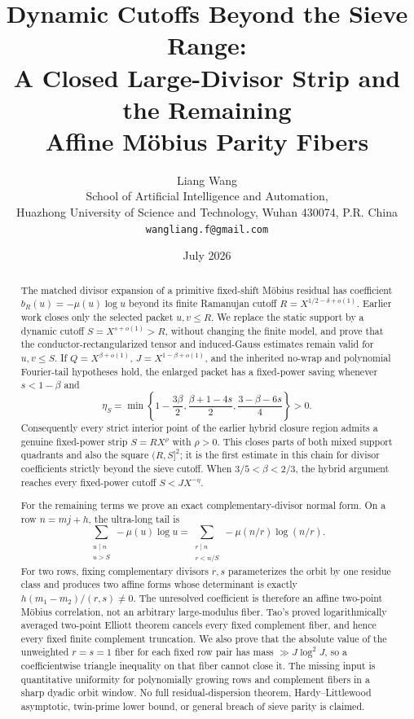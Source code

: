 \documentclass[11pt]{article}
\title{\textbf{Dynamic Cutoffs Beyond the Sieve Range:}\\
\textbf{A Closed Large-Divisor Strip and the Remaining}\\
\textbf{Affine M\"obius Parity Fibers}}
\author{Liang Wang\\
\small School of Artificial Intelligence and Automation,\\[-0.2em]
\small Huazhong University of Science and Technology, Wuhan 430074, P.R. China\\
\small \texttt{wangliang.f@gmail.com}}
\date{July 2026}
\theoremstyle{definition}
\theoremstyle{remark}
\begin{document}
\maketitle

\begin{abstract}
The matched divisor expansion of a primitive fixed-shift M\"obius
residual has coefficient \(b_R(u)=-\mu(u)\log u\) beyond its finite
Ramanujan cutoff \(R=X^{1/2-\delta+o(1)}\).  Earlier work closes only
the selected packet \(u,v\le R\).  We replace the static support by a
dynamic cutoff \(S=X^{s+o(1)}>R\), without changing the finite model,
and prove that the conductor-rectangularized tensor and induced-Gauss
estimates remain valid for \(u,v\le S\).  If
\(Q=X^{\beta+o(1)}\), \(J=X^{1-\beta+o(1)}\), and the inherited
no-wrap and polynomial Fourier-tail hypotheses hold, the enlarged
packet has a fixed-power saving whenever \(s<1-\beta\) and
\[
 \eta_S=\min\left\{
 1-\frac{3\beta}{2},
 \frac{\beta+1-4s}{2},
 \frac{3-\beta-6s}{4}
 \right\}>0.
\]
Consequently every strict interior point of the earlier hybrid closure region
admits a genuine fixed-power strip \(S=RX^\rho\) with \(\rho>0\).
This closes parts of both mixed support quadrants and also the square
\((R,S]^2\); it is the first estimate in this chain for divisor
coefficients strictly beyond the sieve cutoff.  When
\(3/5<\beta<2/3\), the hybrid argument reaches every fixed-power
cutoff \(S<JX^{-\eta}\).

For the remaining terms we prove an exact complementary-divisor normal
form.  On a row \(n=mj+h\), the ultra-long tail is
\[
 \sum_{\substack{u\mid n\\u>S}}-\mu(u)\log u
 =\sum_{\substack{r\mid n\\r<n/S}}
   -\mu(n/r)\log(n/r).
\]
For two rows, fixing complementary divisors \(r,s\) parameterizes the
orbit by one residue class and produces two affine forms whose
determinant is exactly \(h(m_1-m_2)/(r,s)\ne0\).  The unresolved
coefficient is therefore an affine two-point M\"obius correlation,
not an arbitrary large-modulus fiber.  Tao's proved logarithmically
averaged two-point Elliott theorem cancels every fixed complement
fiber, and hence every fixed finite complement truncation.  We also
prove that the absolute value of the unweighted \(r=s=1\) fiber for
each fixed row pair has mass \(\gg J\log^2J\), so a coefficientwise
triangle inequality on that fiber cannot close it.  The missing input
is quantitative uniformity for polynomially
growing rows and complement fibers in a sharp dyadic orbit window.
No full residual-dispersion theorem, Hardy--Littlewood asymptotic,
twin-prime lower bound, or general breach of sieve parity is claimed.
\end{abstract}
\end{document}
